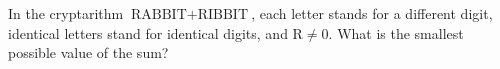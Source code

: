 In the cryptarithm $\text{RABBIT}+\text{RIBBIT}$, each letter stands for a different digit, identical letters stand for identical digits, and $\text{R}\ne0$. What is the smallest possible value of the sum?
